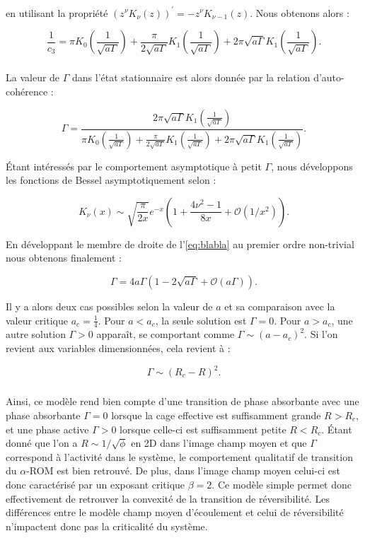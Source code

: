 \noindent en utilisant la propriété $(z^\nu K_\nu (z))^\prime = -z^\nu K_{\nu-1}(z)$. Nous obtenons alors :

\begin{equation}
\frac{1}{c_3} = \pi K_0\left( \frac{1}{\sqrt{a\Gamma}} \right) + \frac{\pi}{2\sqrt{a\Gamma}}K_1\left( \frac{1}{\sqrt{a\Gamma}} \right)+2\pi \sqrt{a\Gamma}K_1\left( \frac{1}{\sqrt{a\Gamma}} \right).
\end{equation}

\subparagraph{}La valeur de $\Gamma$ dans l'état stationnaire est alors donnée par la relation d'auto-cohérence :

\begin{equation}
	\Gamma = \frac{2\pi \sqrt{a\Gamma}K_1\left( \frac{1}{\sqrt{a\Gamma}} \right)}{\pi K_0\left( \frac{1}{\sqrt{a\Gamma}} \right) + \frac{\pi}{2\sqrt{a\Gamma}}K_1\left( \frac{1}{\sqrt{a\Gamma}} \right)+2\pi \sqrt{a\Gamma}K_1\left( \frac{1}{\sqrt{a\Gamma}} \right)}.
	\label{eq:blabla}
\end{equation}

\noindent Étant intéressés par le comportement asymptotique à petit $\Gamma$, nous développons les fonctions de Bessel asymptotiquement selon \cite{abramowitz_handbook_1965} :

\begin{equation}
	K_\nu (x) \sim \sqrt{\frac{\pi}{2x}}e^{-x}\left( 1+\frac{4\nu^2-1}{8x}+\mathcal{O}(1/x^2) \right).
\end{equation}

\noindent En développant le membre de droite de l'\autoref{eq:blabla} au premier ordre non-trivial nous obtenons finalement :

\begin{equation}
	\Gamma = 4a\Gamma\left( 1-2\sqrt{a\Gamma}+\mathcal{O}(a\Gamma) \right).
\end{equation}

\noindent Il y a alors deux cas possibles selon la valeur de $a$ et sa comparaison avec la valeur critique $a_c = \frac{1}{4}$. Pour $a<a_c$, la seule solution est $\Gamma = 0$. Pour $a>a_c$, une autre solution $\Gamma > 0$ apparaît, se comportant comme $\Gamma \sim (a-a_c)^2$. Si l'on revient aux variables dimensionnées, cela revient à :

\begin{equation}
	\Gamma \sim (R_c-R)^2.
	\label{eq:resolhl2d}
\end{equation}

\subparagraph{}Ainsi, ce modèle rend bien compte d'une transition de phase absorbante avec une phase absorbante $\Gamma = 0$ lorsque la cage effective est suffisamment grande $R>R_c$, et une phase active $\Gamma >0$ lorsque celle-ci est suffisamment petite $R<R_c$. Étant donné que l'on a $R\sim 1/\sqrt{\phi}$ en 2D dans l'image champ moyen et que $\Gamma$ correspond à l'activité dans le système, le comportement qualitatif de transition du $\alpha$-ROM est bien retrouvé. De plus, dans l'image champ moyen celui-ci est donc caractérisé par un exposant critique $\beta = 2$. Ce modèle simple permet donc effectivement de retrouver la convexité de la transition de réversibilité. Les différences entre le modèle champ moyen d'écoulement et celui de réversibilité n'impactent donc pas la criticalité du système.


